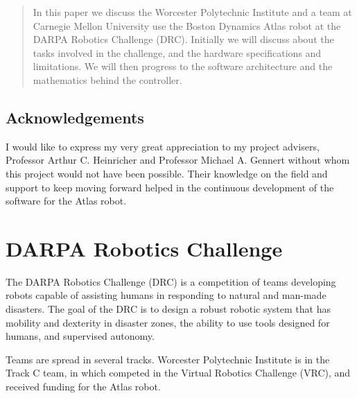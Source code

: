 \documentclass[12pt]{report}
\begin{document}
\setcounter{page}{1}
\begin{abstract}

In this paper we discuss the Worcester Polytechnic Institute and a team at Carnegie Mellon University use the Boston Dynamics Atlas robot at the DARPA Robotics Challenge (DRC). Initially we will discuss about the tasks involved in the challenge, and the hardware specifications and limitations. We will then progress to the software architecture and the mathematics behind the controller. 


\end{abstract}

\newpage

\section*{Acknowledgements}
I would like to express my very great appreciation to my project advisers, Professor Arthur C. Heinricher and Professor Michael A. Gennert without whom this project would not have been possible. Their knowledge on the field and support to keep moving forward helped in the continuous development of the software for the Atlas robot. 

\newpage
\setcounter{page}{1}
\renewcommand{\thepage}{\roman{page}}
\pagestyle{plain}

\newpage
\tableofcontents
\newpage
\renewcommand{\thepage}{\arabic{page}}
\setcounter{page}{1}
\pagestyle{plain}
\chapter{DARPA Robotics Challenge}
 
The DARPA Robotics Challenge (DRC) is a competition of teams developing robots capable of assisting humans in responding to natural and man-made disasters. The goal of the DRC is to design a robust robotic system that has mobility and dexterity in disaster zones, the ability to use tools designed for humans, and supervised autonomy.
 
Teams are spread in several tracks. Worcester Polytechnic Institute is in the Track C team, in which competed in the Virtual Robotics Challenge (VRC), and received funding for the Atlas robot.  
\end{document}

